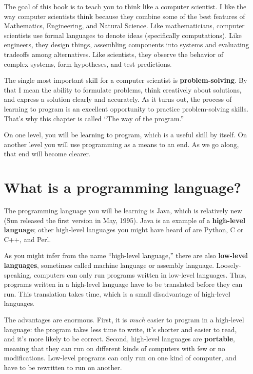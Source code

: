 \documentclass[12pt]{book}
\theoremstyle{exercise}
\begin{document}
The goal of this book is to teach you to think like a
computer scientist.  I like the way computer scientists think because
they combine some of the best features of Mathematics, Engineering,
and Natural Science.  Like mathematicians, computer scientists use formal
languages to denote ideas (specifically computations).  Like
engineers, they design things, assembling components into systems and
evaluating tradeoffs among alternatives.  Like scientists,
they observe the behavior of complex systems, form hypotheses, and test
predictions.

The single most important skill for a computer scientist is {\bf
problem-solving}.  By that I mean the ability to formulate problems,
think creatively about solutions, and express a solution clearly and
accurately.  As it turns out, the process of learning to program is an
excellent opportunity to practice problem-solving skills.  That's why
this chapter is called ``The way of the program.''

On one level, you will be learning to program, which is a useful
skill by itself.  On another level you will use programming
as a means to an end.  As we go along, that end will
become clearer.

\section{What is a programming language?}

The programming language you will be learning is Java, which is
relatively new (Sun released the first version in May, 1995).  Java is
an example of a {\bf high-level language}; other high-level languages
you might have heard of are Python, C or C++, and Perl.

As you might infer from the name ``high-level language,'' there are
also {\bf low-level languages}, sometimes called machine
language or assembly language.  Loosely-speaking, computers can only
run programs written in low-level languages.  Thus, programs
written in a high-level language have to be translated before they can
run.  This translation takes time, which is a small disadvantage
of high-level languages.


The advantages are enormous.  First,
it is {\em much} easier to program in a high-level language:
the program takes less time to write,
it's shorter and easier to read, and it's more likely to be
correct.  Second, high-level languages are {\bf portable},
meaning that they can run on different kinds of computers with
few or no modifications.  Low-level programs can only run
on one kind of computer, and have to be rewritten to run on
another.
\end{document}
